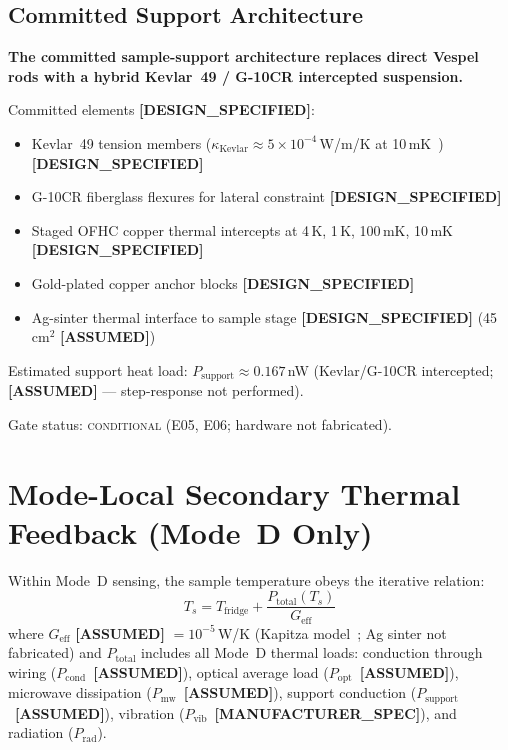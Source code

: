 \documentclass[12pt,a4paper]{article}
\newcommand{\conditional}{\textsc{conditional}}
\newcommand{\assumed}{\textbf{[ASSUMED]}}
\newcommand{\designspec}{\textbf{[DESIGN\_SPECIFIED]}}
\newcommand{\mfrspec}{\textbf{[MANUFACTURER\_SPEC]}}
\begin{document}
\subsection{Committed Support Architecture}

\textbf{The committed sample-support architecture replaces direct Vespel rods
with a hybrid Kevlar~49 / G-10CR intercepted suspension.}

Committed elements \designspec{}:
\begin{itemize}[noitemsep]
  \item Kevlar~49 tension members ($\kappa_\mathrm{Kevlar} \approx 5\times10^{-4}$\,W/m/K at 10\,mK~\cite{Barucci2005}) \designspec{}
  \item G-10CR fiberglass flexures for lateral constraint \designspec{}
  \item Staged OFHC copper thermal intercepts at 4\,K, 1\,K, 100\,mK, 10\,mK \designspec{}
  \item Gold-plated copper anchor blocks \designspec{}
  \item Ag-sinter thermal interface to sample stage \designspec{} (45\,cm$^2$ \assumed{})
\end{itemize}

Estimated support heat load: $P_\mathrm{support} \approx 0.167$\,nW
(Kevlar/G-10CR intercepted; \assumed{} --- step-response not performed).

Gate status: \conditional{} (E05, E06; hardware not fabricated).

\section{Mode-Local Secondary Thermal Feedback (Mode~D Only)}
\label{sec:thermal}

Within Mode~D sensing, the sample temperature obeys the iterative relation:
\begin{equation}
  T_s = T_\mathrm{fridge} + \frac{P_\mathrm{total}(T_s)}{G_\mathrm{eff}}
\end{equation}
where $G_\mathrm{eff}$ \assumed{} $= 10^{-5}$\,W/K (Kapitza model~\cite{SwartzPohl1989,Pobell2007};
Ag sinter not fabricated) and $P_\mathrm{total}$ includes all Mode~D thermal loads:
conduction through wiring ($P_\mathrm{cond}$~\assumed{}), optical average load
($P_\mathrm{opt}$~\assumed{}), microwave dissipation ($P_\mathrm{mw}$~\assumed{}),
support conduction ($P_\mathrm{support}$~\assumed{}), vibration ($P_\mathrm{vib}$~\mfrspec{}),
and radiation ($P_\mathrm{rad}$).
\end{document}
